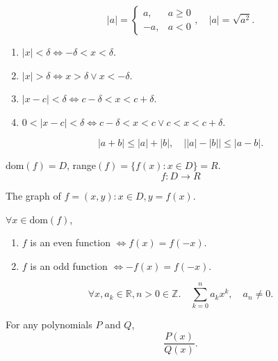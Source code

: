 \documentclass[..\index]{subfiles}
\begin{document}
\begin{definition}
    \[|a|=\begin{cases}
        a, & a\geq0 \\
        -a, & a<0 
    \end{cases},\quad|a|=\sqrt{a^2}.\]

    
\end{definition}
    \begin{enumerate}[label=\alph*.]
        \item $|x|<\delta \iff -\delta<x<\delta$.
        \item $|x|>\delta \iff x>\delta \lor x<-\delta$.
        \item $|x-c|<\delta \iff c-\delta<x<c+\delta$.
        \item $0<|x-c|<\delta \iff c-\delta<x<c \lor c<x<c+\delta$.
    \end{enumerate}
\begin{definition}
    
\end{definition}

\begin{theorem}
    \[|a+b|\leq|a|+|b|, \quad \big||a|-|b|\big|\leq|a-b|.\]
\end{theorem}

\begin{theorem}[]
    
\end{theorem}

\begin{definition}[Functions] %
    dom$(f)=D$, range$(f)=\{f(x) : x \in D\}=R$.
    \[f:D \longrightarrow R\]
\end{definition}

\begin{definition}[Graphs]
    The graph of $f={(x,y): x \in D, y=f(x)}$.
\end{definition}

\begin{definition}
    $\forall x \in \text{dom}(f)$,
    \begin{enumerate}[label=\alph*.]
        \item $f$ is an even function $\iff f(x)=f(-x)$.
        \item $f$ is an odd function $\iff -f(x)=f(-x)$.
    \end{enumerate}
\end{definition}

\begin{definition}
    \[\forall x,a_k \in \mathbb{R}, n>0\in\mathbb{Z}. \quad \sum\limits_{k=0}^{n} a_k x^k, \quad a_n\neq0.\]
\end{definition}

\begin{definition}
    For any polynomials $P$ and $Q$,
    \[\frac{P(x)}{Q(x)}.\]
\end{definition}
\end{document}
